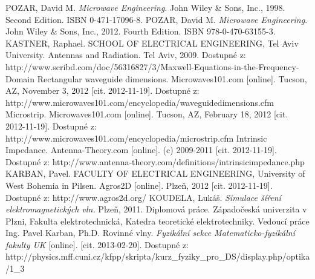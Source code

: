 \documentclass[12pt,a4paper,oneside]{article}
\numberwithin{equation}{section} %
\numberwithin{figure}{section} %
\numberwithin{table}{section} %
\begin{document}
\newpage
{} %
\begin{thebibliography}{10}

 POZAR, David M. \textit{Microwave Engineering}. John Wiley \& Sons, Inc., 1998. Second Edition. ISBN 0-471-17096-8.
 POZAR, David M. \textit{Microwave Engineering}. John Wiley \& Sons, Inc., 2012. Fourth Edition. ISBN 978-0-470-63155-3.
 KASTNER, Raphael. SCHOOL OF ELECTRICAL ENGINEERING, Tel Aviv University. Antennas and Radiation. Tel Aviv, 2009. Dostupné z: http://www.scribd.com/doc/56316827/3/Maxwell-Equations-in-the-Frequency-Domain
 Rectangular waveguide dimensions. Microwaves101.com [online]. Tucson, AZ, November 3, 2012 [cit. 2012-11-19]. Dostupné z: http://www.microwaves101.com/encyclopedia/waveguidedimensions.cfm
 Microstrip. Microwaves101.com [online]. Tucson, AZ, February 18, 2012 [cit. 2012-11-19]. Dostupné z: http://www.microwaves101.com/encyclopedia/microstrip.cfm
 Intrinsic Impedance. Antenna-Theory.com [online]. (c) 2009-2011 [cit. 2012-11-19]. Dostupné z: http://www.antenna-theory.com/definitions/intrinsicimpedance.php
 KARBAN, Pavel. FACULTY OF ELECTRICAL ENGINEERING, University of West Bohemia in Pilsen. Agros2D [online]. Plzeň, 2012 [cit. 2012-11-19]. Dostupné z: http://www.agros2d.org/
 KOUDELA, Lukáš. \textit{Simulace šíření elektromagnetických vln.} Plzeň, 2011. Diplomová práce. Západočeská univerzita v Plzni, Fakulta elektrotechnická, Katedra teoretické elektrotechniky. Vedoucí práce Ing. Pavel Karban, Ph.D.
 Rovinné vlny. \textit{Fyzikální sekce Matematicko-fyzikální fakulty UK} [online]. [cit. 2013-02-20]. Dostupné z: http://physics.mff.cuni.cz/kfpp/skripta/kurz\_fyziky\_pro\_DS/display.php/optika/1\_3


\end{thebibliography}

\newpage
{} %
\setlength{\parskip}{0ex}%
\listoffigures

\newpage
{} %
\listoftables
\end{document}

